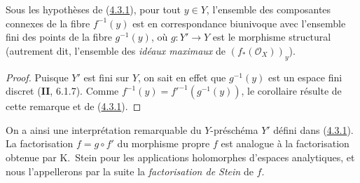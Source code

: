 \begin{corollary}[4.3.3]
\label{III.4.3.3-fr}
Sous les hypothèses de \textup{(\hyperref[III.4.3.1-fr]{4.3.1})}, pour tout $y\in Y$,
l'ensemble des composantes connexes de la fibre $f^{-1}(y)$ est en
correspondance biunivoque avec l'ensemble fini des points de la fibre
$g^{-1}(y)$, où $g:Y'\to Y$ est le morphisme structural \textup{(autrement dit,
l'ensemble des \emph{idéaux maximaux} de $(f_*(\mathcal O_X))_y$)}.
\end{corollary}

\begin{proof}
Puisque $Y'$ est fini sur $Y$, on sait en effet que $g^{-1}(y)$ est un
espace fini discret (\textbf{II}, 6.1.7). Comme
$f^{-1}(y)=f'^{-1}(g^{-1}(y))$, le corollaire résulte de cette remarque et
de (\hyperref[III.4.3.1-fr]{4.3.1}).
\end{proof}

On a ainsi une interprétation remarquable du $Y$-préschéma $Y'$ défini
dans (\hyperref[III.4.3.1-fr]{4.3.1}). La factorisation $f=g\circ f'$ du
morphisme propre $f$ est analogue à la factorisation obtenue par K.~Stein
pour les applications holomorphes d'espaces analytiques, et nous
l'appellerons par la suite la \emph{factorisation de Stein} de $f$.


